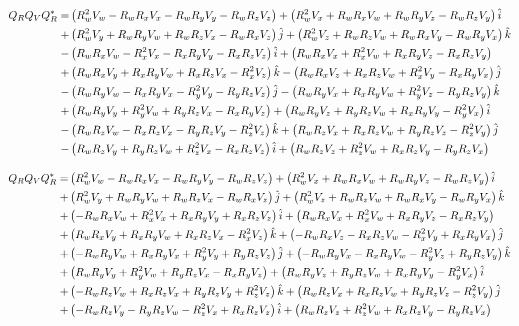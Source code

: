 \begin{align*}
Q_RQ_VQ_R^* = 
	 & \left(R_w^2V_w - R_wR_xV_x - R_wR_yV_y - R_wR_zV_z\right)
	+  \left(R_w^2V_x + R_wR_xV_w + R_wR_yV_z - R_wR_zV_y\right)\hat{\textcolor{black}{i}}\\
	+& \left(R_w^2V_y + R_wR_yV_w + R_wR_zV_x - R_wR_xV_z\right)\hat{\textcolor{black}{j}}
	+  \left(R_w^2V_z + R_wR_zV_w + R_wR_xV_y - R_wR_yV_x\right)\hat{\textcolor{black}{k}}
	\\
	-& \left(R_wR_xV_w - R_x^2V_x - R_xR_yV_y - R_xR_zV_z\right)\hat{\textcolor{black}{i}}
	+  \left(R_wR_xV_x + R_x^2V_w + R_xR_yV_z - R_xR_zV_y\right)\\
	+& \left(R_wR_xV_y + R_xR_yV_w + R_xR_zV_x - R_x^2V_z\right)\hat{\textcolor{black}{k}}
	-  \left(R_wR_xV_z + R_xR_zV_w + R_x^2V_y - R_xR_yV_x\right)\hat{\textcolor{black}{j}}
	\\
	-& \left(R_wR_yV_w - R_xR_yV_x - R_y^2V_y - R_yR_zV_z\right)\hat{\textcolor{black}{j}}
	-  \left(R_wR_yV_x + R_xR_yV_w + R_y^2V_z - R_yR_zV_y\right)\hat{\textcolor{black}{k}}\\
	+& \left(R_wR_yV_y + R_y^2V_w + R_yR_zV_x - R_xR_yV_z\right)
	+  \left(R_wR_yV_z + R_yR_zV_w + R_xR_yV_y - R_y^2V_x\right)\hat{\textcolor{black}{i}}
	\\
	-& \left(R_wR_zV_w - R_xR_zV_x - R_yR_zV_y - R_z^2V_z\right)\hat{\textcolor{black}{k}}
	+  \left(R_wR_zV_x + R_xR_zV_w + R_yR_zV_z - R_z^2V_y\right)\hat{\textcolor{black}{j}}\\
	-& \left(R_wR_zV_y + R_yR_zV_w + R_z^2V_x - R_xR_zV_z\right)\hat{\textcolor{black}{i}}
	+  \left(R_wR_zV_z + R_z^2V_w + R_xR_zV_y - R_yR_zV_x\right)
\end{align*}

\begin{align*}
Q_RQ_VQ_R^* = 
	 & \left(R_w^2V_w - R_wR_xV_x - R_wR_yV_y - R_wR_zV_z\right)
	+  \left(R_w^2V_x + R_wR_xV_w + R_wR_yV_z - R_wR_zV_y\right)\hat{\textcolor{black}{i}}\\
	+& \left(R_w^2V_y + R_wR_yV_w + R_wR_zV_x - R_wR_xV_z\right)\hat{\textcolor{black}{j}}
	+  \left(R_w^2V_z + R_wR_zV_w + R_wR_xV_y - R_wR_yV_x\right)\hat{\textcolor{black}{k}}
	\\
	+& \left(-R_wR_xV_w + R_x^2V_x + R_xR_yV_y + R_xR_zV_z\right)\hat{\textcolor{black}{i}}
	+  \left(R_wR_xV_x + R_x^2V_w + R_xR_yV_z - R_xR_zV_y\right)\\
	+& \left(R_wR_xV_y + R_xR_yV_w + R_xR_zV_x - R_x^2V_z\right)\hat{\textcolor{black}{k}}
	+  \left(-R_wR_xV_z - R_xR_zV_w - R_x^2V_y + R_xR_yV_x\right)\hat{\textcolor{black}{j}}
	\\
	+& \left(-R_wR_yV_w + R_xR_yV_x + R_y^2V_y + R_yR_zV_z\right)\hat{\textcolor{black}{j}}
	+  \left(-R_wR_yV_x - R_xR_yV_w - R_y^2V_z + R_yR_zV_y\right)\hat{\textcolor{black}{k}}\\
	+& \left(R_wR_yV_y + R_y^2V_w + R_yR_zV_x - R_xR_yV_z\right)
	+  \left(R_wR_yV_z + R_yR_zV_w + R_xR_yV_y - R_y^2V_x\right)\hat{\textcolor{black}{i}}
	\\
	+& \left(-R_wR_zV_w + R_xR_zV_x + R_yR_zV_y + R_z^2V_z\right)\hat{\textcolor{black}{k}}
	+  \left(R_wR_zV_x + R_xR_zV_w + R_yR_zV_z - R_z^2V_y\right)\hat{\textcolor{black}{j}}\\
	+& \left(-R_wR_zV_y - R_yR_zV_w - R_z^2V_x + R_xR_zV_z\right)\hat{\textcolor{black}{i}}
	+  \left(R_wR_zV_z + R_z^2V_w + R_xR_zV_y - R_yR_zV_x\right)
\end{align*}

